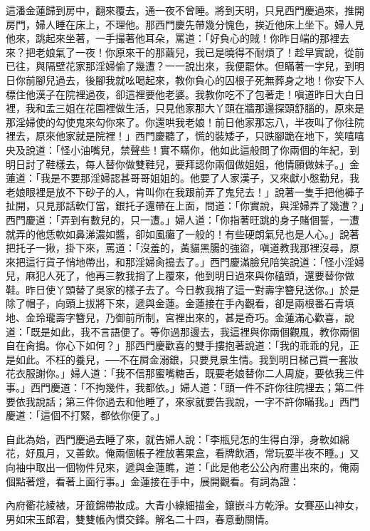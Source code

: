 這潘金蓮歸到房中，翻來覆去，通一夜不曾睡。將到天明，只見西門慶過來，推開房門，婦人睡在床上，不理他。那西門慶先帶幾分愧色，挨近他床上坐下。婦人見他來，跳起來坐著，一手撮著他耳朵，罵道：「好負心的賊！你昨日端的那裡去來？把老娘氣了一夜！你原來干的那繭兒，我已是曉得不耐煩了！趁早實說，從前已往，與隔壁花家那淫婦偷了幾遭？一一說出來，我便罷休。但瞞著一字兒，到明日你前腳兒過去，後腳我就吆喝起來，教你負心的囚根子死無葬身之地！你安下人標住他漢子在院裡過夜，卻這裡要他老婆。我教你吃不了包著走！嗔道昨日大白日裡，我和孟三姐在花園裡做生活，只見他家那大丫頭在牆那邊探頭舒腦的，原來是那淫婦使的勾使鬼來勾你來了。你還哄我老娘！前日他家那忘八，半夜叫了你往院裡去，原來他家就是院裡！」西門慶聽了，慌的裝矮子，只跌腳跪在地下，笑嘻嘻央及說道：「怪小油嘴兒，禁聲些！實不瞞你，他如此這般問了你兩個的年紀，到明日討了鞋樣去，每人替你做雙鞋兒，要拜認你兩個做姐姐，他情願做妹子。」金蓮道：「我是不要那淫婦認甚哥哥姐姐的。他要了人家漢子，又來獻小慇勤兒，我老娘眼裡是放不下砂子的人，肯叫你在我跟前弄了鬼兒去！」說著一隻手把他褲子扯開，只見那話軟仃當，銀托子還帶在上面，問道：「你實說，與淫婦弄了幾遭？」西門慶道：「弄到有數兒的，只一遭。」婦人道：「你指著旺跳的身子賭個誓，一遭就弄的他恁軟如鼻涕濃如醬，卻如風癱了一般的！有些硬朗氣兒也是人心。」說著把托子一揪，掛下來，罵道：「沒羞的，黃貓黑腸的強盜，嗔道教我那裡沒尋，原來把這行貨子悄地帶出，和那淫婦肏搗去了。」西門慶滿臉兒陪笑說道：「怪小淫婦兒，麻犯人死了，他再三教我捎了上覆來，他到明日過來與你磕頭，還要替你做鞋。昨日使丫頭替了吳家的樣子去了。今日教我捎了這一對壽字簪兒送你。」於是除了帽子，向頭上拔將下來，遞與金蓮。金蓮接在手內觀看，卻是兩根番石青填地、金玲瓏壽字簪兒，乃御前所制，宮裡出來的，甚是奇巧。金蓮滿心歡喜，說道：「既是如此，我不言語便了。等你過那邊去，我這裡與你兩個觀風，教你兩個自在肏搗。你心下如何？」那西門慶歡喜的雙手摟抱著說道：「我的乖乖的兒，正是如此。不枉的養兒，──不在屙金溺銀，只要見景生情。我到明日梯己買一套妝花衣服謝你。」婦人道：「我不信那蜜嘴糖舌，既要老娘替你二人周旋，要依我三件事。」西門慶道：「不拘幾件，我都依。」婦人道：「頭一件不許你往院裡去；第二件要依我說話；第三件你過去和他睡了，來家就要告我說，一字不許你瞞我。」西門慶道：「這個不打緊，都依你便了。」

自此為始，西門慶過去睡了來，就告婦人說：「李瓶兒怎的生得白淨，身軟如綿花，好風月，又善飲。俺兩個帳子裡放著果盒，看牌飲酒，常玩耍半夜不睡。」又向袖中取出一個物件兒來，遞與金蓮瞧，道：「此是他老公公內府畫出來的，俺兩個點著燈，看著上面行事。」金蓮接在手中，展開觀看。有詞為證：

內府衢花綾裱，牙籤錦帶妝成。大青小綠細描金，鑲嵌斗方乾淨。女賽巫山神女，男如宋玉郎君，雙雙帳內慣交鋒。解名二十四，春意動關情。

